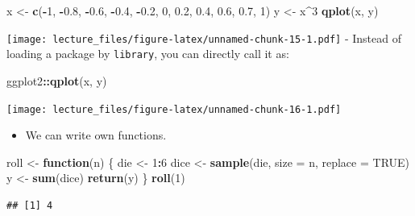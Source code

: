 \documentclass[]{book}
\newenvironment{Shaded}{\begin{snugshade}}{\end{snugshade}}
\newcommand{\KeywordTok}[1]{\textcolor[rgb]{0.13,0.29,0.53}{\textbf{#1}}}
\newcommand{\DataTypeTok}[1]{\textcolor[rgb]{0.13,0.29,0.53}{#1}}
\newcommand{\DecValTok}[1]{\textcolor[rgb]{0.00,0.00,0.81}{#1}}
\newcommand{\FloatTok}[1]{\textcolor[rgb]{0.00,0.00,0.81}{#1}}
\newcommand{\StringTok}[1]{\textcolor[rgb]{0.31,0.60,0.02}{#1}}
\newcommand{\OtherTok}[1]{\textcolor[rgb]{0.56,0.35,0.01}{#1}}
\newcommand{\ControlFlowTok}[1]{\textcolor[rgb]{0.13,0.29,0.53}{\textbf{#1}}}
\newcommand{\OperatorTok}[1]{\textcolor[rgb]{0.81,0.36,0.00}{\textbf{#1}}}
\newcommand{\NormalTok}[1]{#1}
\providecommand{\tightlist}{%
  \setlength{\itemsep}{0pt}\setlength{\parskip}{0pt}}
\begin{document}
\begin{Shaded}
\begin{Highlighting}[]
\NormalTok{x <-}\StringTok{ }\KeywordTok{c}\NormalTok{(}\OperatorTok{-}\DecValTok{1}\NormalTok{, }\OperatorTok{-}\FloatTok{0.8}\NormalTok{, }\OperatorTok{-}\FloatTok{0.6}\NormalTok{, }\OperatorTok{-}\FloatTok{0.4}\NormalTok{, }\OperatorTok{-}\FloatTok{0.2}\NormalTok{, }\DecValTok{0}\NormalTok{, }\FloatTok{0.2}\NormalTok{, }\FloatTok{0.4}\NormalTok{, }\FloatTok{0.6}\NormalTok{, }\FloatTok{0.7}\NormalTok{, }\DecValTok{1}\NormalTok{)}
\NormalTok{y <-}\StringTok{ }\NormalTok{x}\OperatorTok{^}\DecValTok{3}
\KeywordTok{qplot}\NormalTok{(x, y)}
\end{Highlighting}
\end{Shaded}

\texttt{[image: lecture\_files/figure-latex/unnamed-chunk-15-1.pdf]} -
Instead of loading a package by \texttt{library}, you can directly call
it as:

\begin{Shaded}
\begin{Highlighting}[]
\NormalTok{ggplot2}\OperatorTok{::}\KeywordTok{qplot}\NormalTok{(x, y)}
\end{Highlighting}
\end{Shaded}

\texttt{[image: lecture\_files/figure-latex/unnamed-chunk-16-1.pdf]}

\begin{itemize}
\tightlist
\item
  We can write own functions.
\end{itemize}

\begin{Shaded}
\begin{Highlighting}[]
\NormalTok{roll <-}\StringTok{ }\ControlFlowTok{function}\NormalTok{(n) \{}
\NormalTok{  die <-}\StringTok{ }\DecValTok{1}\OperatorTok{:}\DecValTok{6}
\NormalTok{  dice <-}\StringTok{ }\KeywordTok{sample}\NormalTok{(die, }\DataTypeTok{size =}\NormalTok{ n, }\DataTypeTok{replace =} \OtherTok{TRUE}\NormalTok{)}
\NormalTok{  y <-}\StringTok{ }\KeywordTok{sum}\NormalTok{(dice)}
  \KeywordTok{return}\NormalTok{(y)}
\NormalTok{\}}
\KeywordTok{roll}\NormalTok{(}\DecValTok{1}\NormalTok{)}
\end{Highlighting}
\end{Shaded}

\begin{verbatim}
## [1] 4
\end{verbatim}
\end{document}
